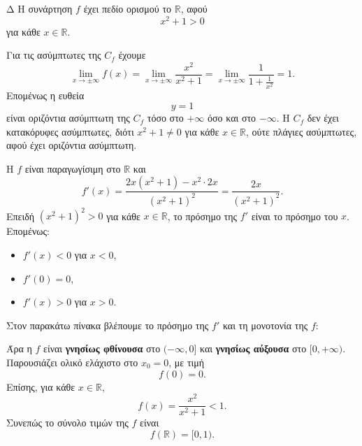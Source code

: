 \begin{thema}{Δ}
Η συνάρτηση $f$ έχει πεδίο ορισμού το $\mathbb{R}$, αφού
\[
x^2+1>0
\]
για κάθε $x\in\mathbb{R}$.
\begin{erwthma}
\item Για τις ασύμπτωτες της $C_f$ έχουμε
\[
\lim_{x\to\pm\infty}f(x)
=\lim_{x\to\pm\infty}\frac{x^2}{x^2+1}
=\lim_{x\to\pm\infty}\frac{1}{1+\frac{1}{x^2}}
=1.
\]
Επομένως η ευθεία
\[
{y=1}
\]
είναι οριζόντια ασύμπτωτη της $C_f$ τόσο στο $+\infty$ όσο και στο $-\infty$. Η $C_f$ δεν έχει κατακόρυφες ασύμπτωτες, διότι $x^2+1\neq0$ για κάθε $x\in\mathbb{R}$, ούτε πλάγιες ασύμπτωτες, αφού έχει οριζόντια ασύμπτωτη.

Η $f$ είναι παραγωγίσιμη στο $\mathbb{R}$ και
\[
f'(x)
=\frac{2x(x^2+1)-x^2\cdot2x}{(x^2+1)^2}
=\frac{2x}{(x^2+1)^2}.
\]
Επειδή $(x^2+1)^2>0$ για κάθε $x\in\mathbb{R}$, το πρόσημο της $f'$ είναι το πρόσημο του $x$. Επομένως:
\begin{itemize}
\item $f'(x)<0$ για $x<0$,
\item $f'(0)=0$,
\item $f'(x)>0$ για $x>0$.
\end{itemize}
Στον παρακάτω πίνακα βλέπουμε το πρόσημο της $f'$ και τη μονοτονία της $f$:
\begin{center}
\end{center}

Άρα η $f$ είναι \textbf{γνησίως φθίνουσα} στο $(-\infty,0]$ και \textbf{γνησίως αύξουσα} στο $[0,+\infty)$. Παρουσιάζει ολικό ελάχιστο στο $x_0=0$, με τιμή
\[
f(0)=0.
\]
Επίσης, για κάθε $x\in\mathbb{R}$,
\[
f(x)=\frac{x^2}{x^2+1}<1.
\]
Συνεπώς το σύνολο τιμών της $f$ είναι
\[
{f(\mathbb{R})=[0,1)}.
\]


\end{erwthma}
\end{thema}
